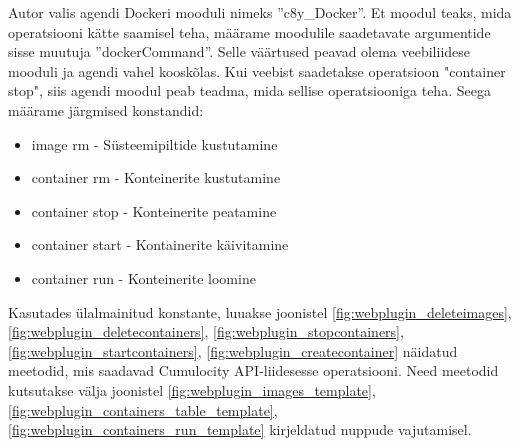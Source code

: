 \documentclass[12pt]{article}
\begin{document}
  \FloatBarrier
 
  Autor valis agendi Dockeri mooduli nimeks ''c8y\_Docker''. Et moodul teaks,
  mida operatsiooni kätte saamisel teha, määrame moodulile saadetavate argumentide
  sisse muutuja ''dockerCommand''. Selle väärtused peavad olema veebiliidese mooduli ja
  agendi vahel kooskõlas. Kui veebist saadetakse operatsioon "container stop", siis agendi moodul
  peab teadma, mida sellise operatsiooniga teha. Seega määrame
  järgmised konstandid:
 
  \begin{itemize}
  \item image rm - Süsteemipiltide kustutamine
  \item container rm - Konteinerite kustutamine
  \item container stop - Konteinerite peatamine
  \item container start - Kontainerite käivitamine
  \item container run - Konteinerite loomine
  \end{itemize}
 
 
  Kasutades ülalmainitud konstante, luuakse joonistel
  \ref{fig:webplugin_deleteimages},
  \ref{fig:webplugin_deletecontainers},
  \ref{fig:webplugin_stopcontainers},
  \ref{fig:webplugin_startcontainers},
  \ref{fig:webplugin_createcontainer}
  näidatud meetodid, mis saadavad Cumulocity API-liidesesse operatsiooni.
  Need meetodid kutsutakse välja joonistel
  \ref{fig:webplugin_images_template},
  \ref{fig:webplugin_containers_table_template},
  \ref{fig:webplugin_containers_run_template}
  kirjeldatud nuppude vajutamisel.
 
\end{document}
